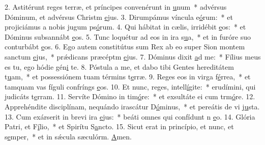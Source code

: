 2. Astitérunt reges terræ, et príncipes convenérunt in \uline{u}num~* advérsus Dóminum, et advérsus Christm \uline{e}jus.
3. Dirumpámus víncula e\uline{ó}rum:~* et projiciámus a nobis jugum ps\uline{ó}rum.
4. Qui hábitat in cælis, irridébit \uline{e}os:~* et Dóminus subsannábt \uline{e}os.
5. Tunc loquétur ad eos in ira s\uline{u}a,~* et in furóre suo conturbábt \uline{e}os.
6. Ego autem constitútus sum Rex ab eo super Sion montem sanctum \uline{e}jus,~* prǽdicans præcéptm \uline{e}jus.
7. Dóminus dixit \uline{a}d me:~* Fílius meus es tu, ego hódie gén\uline{i} te.
8. Póstula a me, et dabo tibi Gentes hereditátem t\uline{u}am,~* et possessiónem tuam términs t\uline{e}rræ.
9. Reges eos in virga f\uline{é}rrea,~* et tamquam vas fíguli confríngs \uline{e}os.
10. Et nunc, reges, intell\uline{í}gite:~* erudímini, qui judicáts t\uline{e}rram.
11. Servíte Dómino in tim\uline{ó}re:~* et exsultáte ei cum trm\uline{ó}re.
12. Apprehéndite disciplínam, nequándo irascátur D\uline{ó}minus,~* et pereátis de vi j\uline{u}sta.
13. Cum exárserit in brevi ira \uline{e}jus:~* beáti omnes qui confídunt n \uline{e}o.
14. Glória Patri, et F\uline{í}lio,~* et Spirítu S\uline{a}ncto.
15. Sicut erat in princípio, et nunc, et s\uline{e}mper,~* et in sǽcula sæculórm. \uline{A}men.
